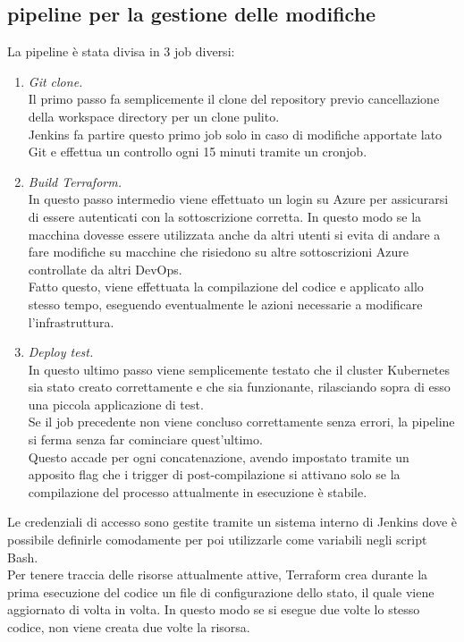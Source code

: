 \documentclass[a4paper,12pt]{report}
\begin{document}
\subsection{pipeline per la gestione delle modifiche}
La pipeline è stata divisa in 3 job diversi:
\begin{enumerate}
\item \textit{Git clone.} \\
Il primo passo fa semplicemente il clone del repository previo cancellazione della workspace directory per un clone pulito.\\
Jenkins fa partire questo primo job solo in caso di modifiche apportate lato Git e effettua un controllo ogni 15 minuti tramite un cronjob.
\item \textit{Build Terraform.} \\
In questo passo intermedio viene effettuato un login su Azure per assicurarsi di essere autenticati con la sottoscrizione corretta. In questo modo se la macchina dovesse essere utilizzata anche da altri utenti si evita di andare a fare modifiche su macchine che risiedono su altre sottoscrizioni Azure controllate da altri DevOps.\\
Fatto questo, viene effettuata la compilazione del codice e applicato allo stesso tempo, eseguendo eventualmente le azioni necessarie a modificare l'infrastruttura.\\
\item \textit{Deploy test.} \\
In questo ultimo passo viene semplicemente testato che il cluster Kubernetes sia stato creato correttamente e che sia funzionante, rilasciando sopra di esso una piccola applicazione di test.\\
Se il job precedente non viene concluso correttamente senza errori, la pipeline si ferma senza far cominciare quest'ultimo.\\
Questo accade per ogni concatenazione, avendo impostato tramite un apposito flag che i trigger di post-compilazione si attivano solo se la compilazione del processo attualmente in esecuzione è stabile.\\
\end{enumerate}

Le credenziali di accesso sono gestite tramite un sistema interno di Jenkins dove è possibile definirle comodamente per poi utilizzarle come variabili negli script Bash.\\
Per tenere traccia delle risorse attualmente attive, Terraform crea durante la prima esecuzione del codice un file di configurazione dello stato, il quale viene aggiornato di volta in volta. In questo modo se si esegue due volte lo stesso codice, non viene creata due volte la risorsa.
\end{document}
